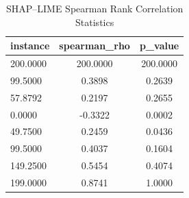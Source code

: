 \begin{table}
\centering
\caption{SHAP–LIME Spearman Rank Correlation Statistics}
\label{tab:agreement}
\begin{tabular}{lcc}
\toprule
instance & spearman_rho & p_value \\
\midrule
200.0000 & 200.0000 & 200.0000 \\
99.5000 & 0.3898 & 0.2639 \\
57.8792 & 0.2197 & 0.2655 \\
0.0000 & -0.3322 & 0.0002 \\
49.7500 & 0.2459 & 0.0436 \\
99.5000 & 0.4037 & 0.1604 \\
149.2500 & 0.5454 & 0.4074 \\
199.0000 & 0.8741 & 1.0000 \\
\bottomrule
\end{tabular}
\end{table}
